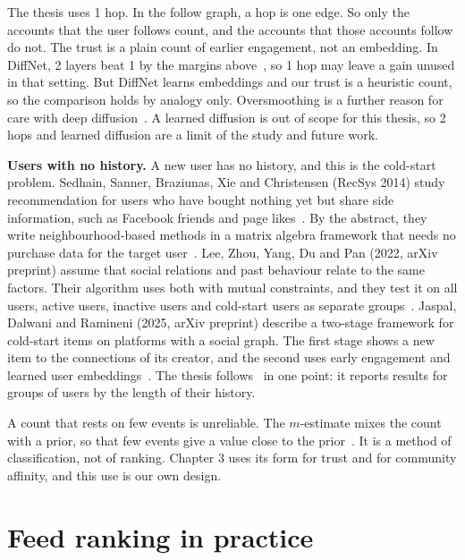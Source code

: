 The thesis uses 1 hop. In the follow graph, a hop is one edge. So only the accounts that the user follows count, and the accounts that those accounts follow do not. The trust is a plain count of earlier engagement, not an embedding. In DiffNet, 2 layers beat 1 by the margins above~, so 1 hop may leave a gain unused in that setting. But DiffNet learns embeddings and our trust is a heuristic count, so the comparison holds by analogy only. Oversmoothing is a further reason for care with deep diffusion~. A learned diffusion is out of scope for this thesis, so 2 hops and learned diffusion are a limit of the study and future work.

\textbf{Users with no history.} A new user has no history, and this is the cold-start problem. Sedhain, Sanner, Braziunas, Xie and Christensen (RecSys 2014) study recommendation for users who have bought nothing yet but share side information, such as Facebook friends and page likes~. By the abstract, they write neighbourhood-based methods in a matrix algebra framework that needs no purchase data for the target user~. Lee, Zhou, Yang, Du and Pan (2022, arXiv preprint) assume that social relations and past behaviour relate to the same factors. Their algorithm uses both with mutual constraints, and they test it on all users, active users, inactive users and cold-start users as separate groups~. Jaspal, Dalwani and Ramineni (2025, arXiv preprint) describe a two-stage framework for cold-start items on platforms with a social graph. The first stage shows a new item to the connections of its creator, and the second uses early engagement and learned user embeddings~. The thesis follows~ in one point: it reports results for groups of users by the length of their history.

A count that rests on few events is unreliable. The $m$-estimate mixes the count with a prior, so that few events give a value close to the prior~. It is a method of classification, not of ranking. Chapter 3 uses its form for trust and for community affinity, and this use is our own design.

\section{Feed ranking in practice}
\label{sec:lit-feed}

